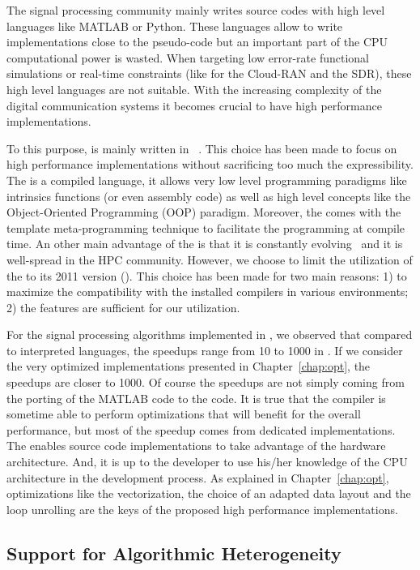 The signal processing community mainly writes source codes with high level
languages like MATLAB or Python. These languages allow to write implementations
close to the pseudo-code but an important part of the CPU computational power is
wasted. When targeting low error-rate functional simulations or real-time
constraints (like for the Cloud-RAN and the SDR), these high level languages are
not suitable. With the increasing complexity of the digital communication
systems it becomes crucial to have high performance implementations.

To this purpose, \AFFECT is mainly written in \Cxx~\cite{Stroustrup2013}. This
choice has been made to focus on high performance implementations without
sacrificing too much the expressibility. The \Cxx is a compiled language, it
allows very low level programming paradigms like intrinsics functions (or even
assembly code) as well as high level concepts like the Object-Oriented
Programming (OOP) paradigm. Moreover, the \Cxx comes with the template
meta-programming technique to facilitate the programming at compile time. An
other main advantage of the \Cxx is that it is constantly
evolving~\cite{Stroustrup2020} and it is well-spread in the HPC community.
However, we choose to limit the utilization of the \Cxx to its 2011 version
(). This choice has been made for two main reasons: 1) to maximize the
compatibility with the installed compilers in various environments; 2) the
 features are sufficient for our utilization.

For the signal processing algorithms implemented in \AFFECT, we observed that
compared to interpreted languages, the speedups range from 10 to 1000 in \Cxx.
If we consider the very optimized implementations presented in
Chapter~\ref{chap:opt}, the speedups are closer to 1000. Of course the speedups
are not simply coming from the porting of the MATLAB code to the \Cxx code. It
is true that the compiler is sometime able to perform optimizations that will
benefit for the overall performance, but most of the speedup comes from
dedicated implementations. The \Cxx enables source code implementations to take
advantage of the hardware architecture. And, it is up to the developer to use
his/her knowledge of the CPU architecture in the development process. As
explained in Chapter~\ref{chap:opt}, optimizations like the vectorization, the
choice of an adapted data layout and the loop unrolling are the keys of the
proposed high performance implementations.

\subsection{Support for Algorithmic Heterogeneity}

